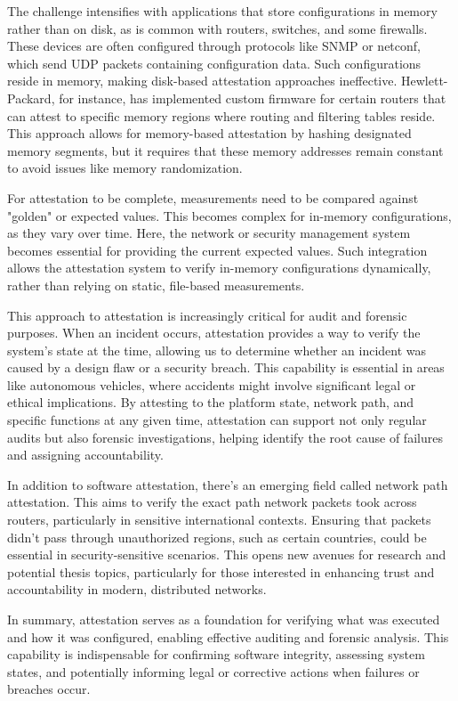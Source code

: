 The challenge intensifies with applications that store configurations
in memory rather than on disk, as is common with routers, switches,
and some firewalls. These devices are often configured through
protocols like SNMP or netconf, which send UDP packets containing
configuration data. Such configurations reside in memory, making
disk-based attestation approaches ineffective. Hewlett-Packard, for
instance, has implemented custom firmware for certain routers that can
attest to specific memory regions where routing and filtering tables
reside. This approach allows for memory-based attestation by hashing
designated memory segments, but it requires that these memory
addresses remain constant to avoid issues like memory randomization.

For attestation to be complete, measurements need to be compared
against "golden" or expected values. This becomes complex for
in-memory configurations, as they vary over time. Here, the network or
security management system becomes essential for providing the current
expected values. Such integration allows the attestation system to
verify in-memory configurations dynamically, rather than relying on
static, file-based measurements.

This approach to attestation is increasingly critical for audit and
forensic purposes. When an incident occurs, attestation provides a way
to verify the system’s state at the time, allowing us to determine
whether an incident was caused by a design flaw or a security breach.
This capability is essential in areas like autonomous vehicles, where
accidents might involve significant legal or ethical implications. By
attesting to the platform state, network path, and specific functions
at any given time, attestation can support not only regular audits but
also forensic investigations, helping identify the root cause of
failures and assigning accountability.

In addition to software attestation, there’s an emerging field called
network path attestation. This aims to verify the exact path network
packets took across routers, particularly in sensitive international
contexts. Ensuring that packets didn’t pass through unauthorized
regions, such as certain countries, could be essential in
security-sensitive scenarios. This opens new avenues for research and
potential thesis topics, particularly for those interested in
enhancing trust and accountability in modern, distributed networks.

In summary, attestation serves as a foundation for verifying what was
executed and how it was configured, enabling effective auditing and
forensic analysis. This capability is indispensable for confirming
software integrity, assessing system states, and potentially informing
legal or corrective actions when failures or breaches occur.

